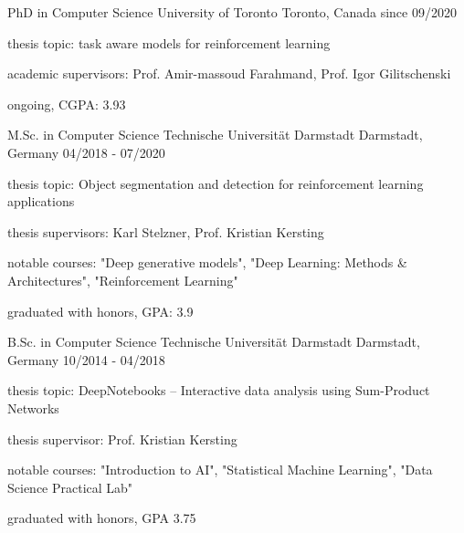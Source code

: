 

\begin{cventries}

  \cventry
    {PhD in Computer Science} %
    {University of Toronto} %
    {Toronto, Canada} %
    {since 09/2020} %
    {
        \begin{cvitems}
        \item {thesis topic: task aware models for reinforcement learning}
        \item {academic supervisors: Prof. Amir-massoud Farahmand, Prof. Igor Gilitschenski}
        \item {ongoing, CGPA: 3.93}
        \end{cvitems}
    }

  \cventry
    {M.Sc. in Computer Science} %
    {Technische Universität Darmstadt} %
    {Darmstadt, Germany} %
    {04/2018 - 07/2020} %
    {
        \begin{cvitems}
        \item {thesis topic: Object segmentation and detection for reinforcement learning applications}
        \item {thesis supervisors: Karl Stelzner, Prof. Kristian Kersting}
        \item {notable courses: "Deep generative models", "Deep Learning: Methods \& Architectures", "Reinforcement Learning"}
        \item {graduated with honors, GPA: 3.9}
        \end{cvitems}
    }

  \cventry
    {B.Sc. in Computer Science} %
    {Technische Universität Darmstadt} %
    {Darmstadt, Germany} %
    {10/2014 - 04/2018} %
    {
      \begin{cvitems} %
      \item {thesis topic: DeepNotebooks -- Interactive data analysis using Sum-Product Networks}
      \item {thesis supervisor: Prof. Kristian Kersting}
      \item {notable courses: "Introduction to AI", "Statistical Machine Learning", "Data Science Practical Lab"}
      \item {graduated with honors, GPA 3.75}
      \end{cvitems}
    }


\end{cventries}
